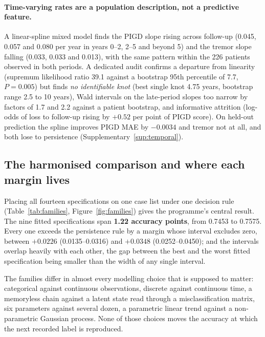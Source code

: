 \documentclass[11pt]{article}
\begin{document}
\paragraph{Time-varying rates are a population description, not a predictive
feature.} A linear-spline mixed model finds the PIGD slope rising across
follow-up (0.045, 0.057 and 0.080 per year in years 0--2, 2--5 and beyond 5) and
the tremor slope falling (0.033, 0.033 and 0.013), with the same pattern within
the 226 patients observed in both periods. A dedicated audit confirms a departure
from linearity (supremum likelihood ratio 39.1 against a bootstrap 95th
percentile of 7.7, $P = 0.005$) but finds \emph{no identifiable knot} (best
single knot 4.75 years, bootstrap range 2.5 to 10 years), Wald intervals on the
late-period slopes too narrow by factors of 1.7 and 2.2 against a patient
bootstrap, and informative attrition (log-odds of loss to follow-up rising by
$+0.52$ per point of PIGD score). On held-out prediction the spline improves PIGD
MAE by $-0.0034$ and tremor not at all, and both lose to persistence
(Supplementary~\ref{sup:temporal}).

\subsection{The harmonised comparison and where each margin lives}
\label{sec:harmonised}

Placing all fourteen specifications on one case list under one decision rule
(Table~\ref{tab:families}, Figure~\ref{fig:families}) gives the programme's
central result. The nine fitted specifications span \textbf{1.22 accuracy
points}, from 0.7453 to 0.7575. Every one exceeds the persistence rule by a
margin whose interval excludes zero, between $+0.0226$ (0.0135--0.0316) and
$+0.0348$ (0.0252--0.0450); and the intervals overlap heavily with each other,
the gap between the best and the worst fitted specification being smaller than
the width of any single interval.

The families differ in almost every modelling choice that is supposed to matter:
categorical against continuous observations, discrete against continuous time, a
memoryless chain against a latent state read through a misclassification matrix,
six parameters against several dozen, a parametric linear trend against a
non-parametric Gaussian process. None of those choices moves the accuracy at
which the next recorded label is reproduced.
\end{document}
